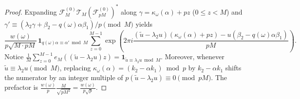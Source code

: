 \documentclass[11pt,a4paper]{article}
\numberwithin{equation}{section}
\theoremstyle{definition}
\theoremstyle{remark}
\newcommand{\cF}{\mathcal{F}}
\newcommand{\cT}{\mathcal{T}}
\begin{document}
\begin{proof}
Expanding $\cF_M^{(0)}\cT_M(\cF_{pM}^{(0)})^*$ along $\gamma = \kappa_\omega(\alpha) + p z$ ($0 \le z < M$) and $\gamma' \equiv (\lambda_2 \gamma + \beta_2 - q(\omega)\alpha\beta_1)/p \pmod M$ yields
\[
\frac{w(\omega)}{p\sqrt{M\cdot pM}}\,\mathbf{1}_{q(\omega)\alpha \equiv \alpha' \bmod M}\sum_{z=0}^{M-1} \exp\!\left(2\pi i \frac{(\tilde u - \lambda_2 u)(\kappa_\omega(\alpha) + p z) - u(\beta_2 - q(\omega)\alpha\beta_1)}{pM}\right).
\]
Notice $\frac{1}{M}\sum_{z=0}^{M-1} e_M((\tilde u - \lambda_2 u)z) = \mathbf{1}_{\tilde u \equiv \lambda_2 u \bmod M}$. Moreover, whenever $\tilde u \equiv \lambda_2 u \pmod M$, replacing $\kappa_\omega(\alpha) = (k_2 - \alpha k_1) \bmod p$ by $k_2 - \alpha k_1$ shifts the numerator by an integer multiple of $p(\tilde u - \lambda_2 u) \equiv 0 \pmod{pM}$. The prefactor is $\frac{w(\omega)}{p}\frac{M}{\sqrt{p M^2}} = \frac{w(\omega)}{p\sqrt{p}}$.
\end{proof}
\end{document}
